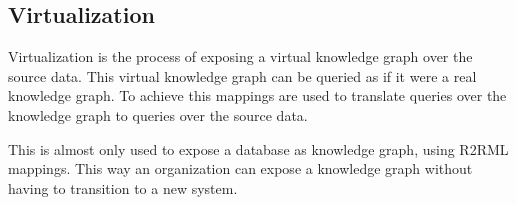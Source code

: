 \subsection{Virtualization}
Virtualization is the process of exposing a virtual knowledge graph over the source data. This virtual knowledge graph can be queried as if it were a real knowledge graph. To achieve this mappings are used to translate queries over the knowledge graph to queries over the source data. 

This is almost only used to expose a database as knowledge graph, using R2RML mappings. This way an organization can expose a knowledge graph without having to transition to a new system. 
